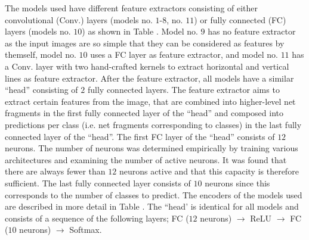 The models used have different feature extractors consisting of either convolutional (Conv.) layers (models no. $1$-$8$, no. $11$) or fully connected (FC) layers (models no. $10$) as shown in Table .
Model no. $9$ has no feature extractor as the input images are so simple that they can be considered as features by themself, model no. $10$ uses a FC layer as feature extractor, and model no. $11$ has a Conv. layer with two hand-crafted kernels to extract horizontal and vertical lines as feature extractor.
After the feature extractor, all models have a similar ``head'' consisting of $2$ fully connected layers.
The feature extractor aims to extract certain features from the image, that are combined into higher-level net fragments in the first fully connected layer of the ``head'' and composed into predictions per class (i.e. net fragments corresponding to classes) in the last fully connected layer of the ``head''.
The first FC layer of the ``head'' consists of $12$ neurons.
The number of neurons was determined empirically by training various architectures and examining the number of active neurons.
It was found that there are always fewer than $12$ neurons active and that this capacity is therefore sufficient.
The last fully connected layer consists of $10$ neurons since this corresponds to the number of classes to predict.
The encoders of the models used are described in more detail in Table .
The ``head' is identical for all models and consists of a sequence of the following layers; FC ($12$ neurons) $\rightarrow$ ReLU $\rightarrow$ FC ($10$ neurons) $\rightarrow$ Softmax.

